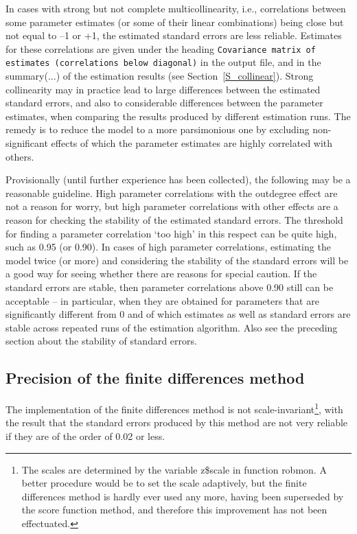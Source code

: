 \documentclass[a4paper,fleqn,11pt]{article}
\newcommand{\+}{\, + \,}
\newcommand{\sfn}[1]{\textsf{#1}}
\begin{document}
In cases with strong but not complete multicollinearity,
i.e., correlations between some parameter estimates
(or some of their linear combinations) being close but not equal to --1 or +1,
the estimated standard errors are less reliable.
 Estimates for these correlations
are given under the heading
\texttt{Covariance matrix of estimates (correlations below diagonal)}
in the output file, and in the \textsf{summary(...)} of the estimation results
(see Section~\ref{S_collinear}).
Strong collinearity may in practice lead to large differences
between the estimated standard errors,
and also to considerable differences between the parameter estimates,
when comparing the results produced by different estimation runs.
The remedy is to reduce the model to a more parsimonious one
by excluding non-significant effects of which the parameter
estimates are highly correlated with others.

Provisionally (until further experience has been collected),
the following may be a reasonable guideline.
High parameter correlations with the outdegree effect are not a
reason for worry, but high parameter correlations with other effects are
a reason for checking the stability of the estimated standard errors. The
threshold for finding a parameter correlation `too high' in this respect
can be quite high, such as 0.95 (or 0.90).
In cases of high parameter correlations, estimating the model twice
(or more) and considering the stability of the standard errors will be
a good way for seeing whether there are reasons for special caution.
If the standard errors are stable, then parameter correlations above
0.90 still can be acceptable -- in particular, when they are obtained
for parameters that are significantly different from 0 and of which
estimates as well as standard errors are stable across repeated runs of
the estimation algorithm.
Also see the preceding section about the stability of standard errors.

\subsection{Precision of the finite differences method}

The implementation of the finite differences method is not
scale-invariant\footnote{The scales are determined by the
variable \sfn{z\$scale} in function \sfn{robmon}.
A better procedure would be to set the scale adaptively,
but the finite differences method is hardly ever used any more,
having been superseded by the score function method,
and therefore this improvement has not been effectuated.},
with the result that the standard errors produced by this method
are not very reliable if they are of the order of 0.02 or less.
\end{document}
